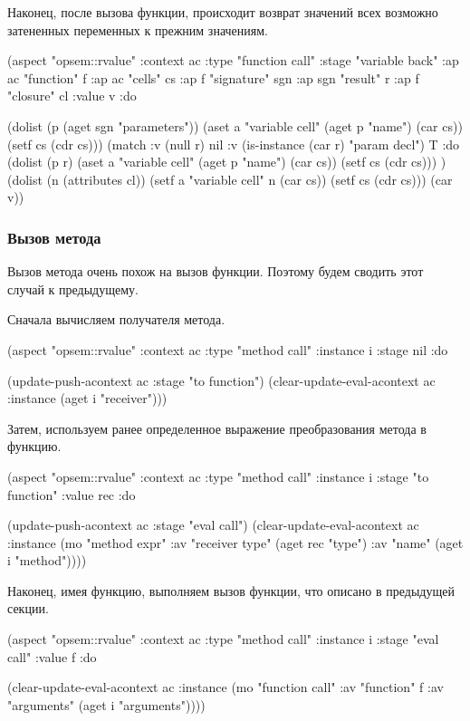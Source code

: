\documentclass[12pt,twoside,russian]{article}
\begin{document}
Наконец, после вызова функции, происходит возврат значений всех возможно затененных переменных к прежним значениям.

\begin{ABMLCode}
(aspect "opsem::rvalue" :context ac :type "function call" 
  :stage "variable back" :ap ac "function" f :ap ac "cells" cs 
  :ap f "signature" sgn :ap sgn "result" r :ap f "closure" cl 
  :value v :do 
  
  (dolist (p (aget sgn "parameters")) (aset a "variable cell" 
    (aget p "name") (car cs)) (setf cs (cdr cs)))
  (match :v (null r) nil :v (is-instance (car r) "param decl") T 
  :do (dolist (p r) (aset a "variable cell" (aget p "name") (car cs)) 
              (setf cs (cdr cs)))
  )
  (dolist (n (attributes cl)) (setf a "variable cell" n (car cs)) 
          (setf cs (cdr cs)))
  (car v))
\end{ABMLCode}

\subsubsection{Вызов метода}
Вызов метода очень похож на вызов функции. Поэтому будем сводить этот случай к предыдущему.

Сначала вычисляем получателя метода.

\begin{ABMLCode}
(aspect "opsem::rvalue" :context ac :type "method call" :instance i 
  :stage nil :do 
  
  (update-push-acontext ac :stage "to function")
  (clear-update-eval-acontext ac :instance (aget i "receiver")))
\end{ABMLCode}

Затем, используем ранее определенное выражение преобразования метода в функцию.

\begin{ABMLCode}
(aspect "opsem::rvalue" :context ac :type "method call" :instance i 
  :stage "to function" :value rec :do 
  
  (update-push-acontext ac :stage "eval call")
  (clear-update-eval-acontext ac :instance (mo "method expr" 
    :av "receiver type" (aget rec "type") :av "name" (aget i "method"))))
\end{ABMLCode}

Наконец, имея функцию, выполняем вызов функции, что описано в предыдущей секции.

\begin{ABMLCode}
(aspect "opsem::rvalue" :context ac :type "method call" :instance i 
  :stage "eval call" :value f :do 
  
  (clear-update-eval-acontext ac :instance (mo "function call" 
    :av "function" f :av "arguments" (aget i "arguments"))))
\end{ABMLCode}
\end{document}
